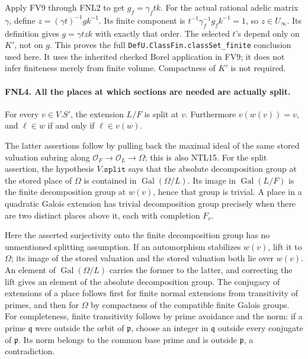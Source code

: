 \documentclass[11pt,a4paper]{article}
\numberwithin{equation}{section}
\theoremstyle{remark}\newtheorem{remark}[theorem]{Remark}
\begin{document}
Apply FV9 through FNL2 to get
\(g_f=\gamma_f t k\).  For the actual rational adelic matrix
\(\gamma\), define \(z=(\gamma t)^{-1}gk^{-1}\).
Its finite component is
\(t^{-1}\gamma_f^{-1}g_f k^{-1}=1\), so \(z\in U_\infty\).
Its definition gives \(g=\gamma t z k\) with exactly that order.
The selected \(t\)'s depend only on \(K'\), not on \(g\).
This proves the full \texttt{Def\allowbreak U.\allowbreak Class\allowbreak Fin.\allowbreak class\allowbreak Set\_\allowbreak finite} conclusion
used here.  It uses the inherited checked Borel application in FV9;
it does not infer finiteness merely from finite volume.  Compactness
of \(K'\) is not required.

\paragraph{FNL4. All the places at which sections are needed are actually split.}
\label{claim:FNL4}
For every \(v\in V.S'\), the extension \(L/F\) is split at \(v\).
Furthermore \(v(w(v))=v\), and
\(\ell\in w\) if and only if \(\ell\in v(w)\).

The latter assertions follow by pulling back the maximal ideal of the
same stored valuation subring along
\(\mathcal O_F\to\mathcal O_L\to\Omega\); this is also NTL15.
For the split assertion, the hypothesis \(V.\texttt{split}\) says
that the absolute decomposition group at the stored place of \(\Omega\)
is contained in \(\operatorname{Gal}(\Omega/L)\).
Its image in \(\operatorname{Gal}(L/F)\) is the finite decomposition
group at \(w(v)\), hence that group is trivial.  A place in a quadratic
Galois extension has trivial decomposition group precisely when there
are two distinct places above it, each with completion \(F_v\).

Here the asserted surjectivity onto the finite decomposition group has
no unmentioned splitting assumption.  If an automorphism stabilizes
\(w(v)\), lift it to \(\Omega\); its image of the stored valuation
and the stored valuation both lie over \(w(v)\).  An element of
\(\operatorname{Gal}(\Omega/L)\) carries the former to the latter,
and correcting the lift gives an element of the absolute decomposition
group.  The conjugacy of extensions of a place follows first for finite
normal extensions from transitivity of primes, and then for \(\Omega\)
by compactness of the compatible finite Galois groups.  For completeness,
finite transitivity follows by prime avoidance and the norm: if a prime
\(\mathfrak q\) were outside the orbit of \(\mathfrak p\), choose an
integer in \(\mathfrak q\) outside every conjugate of \(\mathfrak p\).
Its norm belongs to the common base prime and is outside
\(\mathfrak p\), a contradiction.
\end{document}
